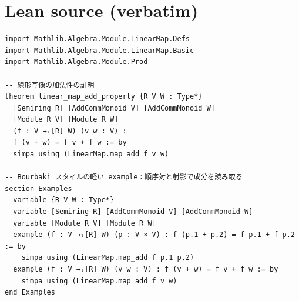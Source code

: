 \documentclass[12pt]{article}
\begin{document}
\section*{Lean source (verbatim)}
\begin{lstlisting}
import Mathlib.Algebra.Module.LinearMap.Defs
import Mathlib.Algebra.Module.LinearMap.Basic
import Mathlib.Algebra.Module.Prod

-- 線形写像の加法性の証明
theorem linear_map_add_property {R V W : Type*} 
  [Semiring R] [AddCommMonoid V] [AddCommMonoid W] 
  [Module R V] [Module R W]
  (f : V →ₗ[R] W) (v w : V) : 
  f (v + w) = f v + f w := by
  simpa using (LinearMap.map_add f v w)

-- Bourbaki スタイルの軽い example：順序対と射影で成分を読み取る
section Examples
  variable {R V W : Type*}
  variable [Semiring R] [AddCommMonoid V] [AddCommMonoid W]
  variable [Module R V] [Module R W]
  example (f : V →ₗ[R] W) (p : V × V) : f (p.1 + p.2) = f p.1 + f p.2 := by
    simpa using (LinearMap.map_add f p.1 p.2)
  example (f : V →ₗ[R] W) (v w : V) : f (v + w) = f v + f w := by
    simpa using (LinearMap.map_add f v w)
end Examples

\end{lstlisting}
\end{document}
